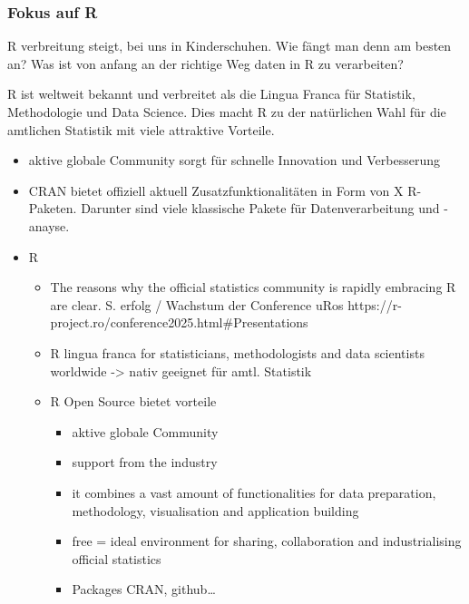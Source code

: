 \documentclass[
  german,
  10pt,
  twoside]{article}
\providecommand{\tightlist}{%
  \setlength{\itemsep}{0pt}\setlength{\parskip}{0pt}}
\begin{document}
\subsubsection{Fokus auf R}\label{fokus-auf-r}

R verbreitung steigt, bei uns in Kinderschuhen. Wie fängt man denn am
besten an? Was ist von anfang an der richtige Weg daten in R zu
verarbeiten?

R ist weltweit bekannt und verbreitet als die Lingua Franca für
Statistik, Methodologie und Data Science. Dies macht R zu der
natürlichen Wahl für die amtlichen Statistik mit viele attraktive
Vorteile.

\begin{itemize}
\item
  aktive globale Community sorgt für schnelle Innovation und
  Verbesserung
\item
  CRAN bietet offiziell aktuell Zusatzfunktionalitäten in Form von X
  R-Paketen. Darunter sind viele klassische Pakete für Datenverarbeitung
  und -anayse.
\item
  R

  \begin{itemize}
  \tightlist
  \item
    The reasons why the official statistics community is rapidly
    embracing R are clear. S. erfolg / Wachstum der Conference uRos
    https://r-project.ro/conference2025.html\#Presentations
  \item
    R lingua franca for statisticians, methodologists and data
    scientists worldwide -\textgreater{} nativ geeignet für amtl.
    Statistik
  \item
    R Open Source bietet vorteile

    \begin{itemize}
    \tightlist
    \item
      aktive globale Community
    \item
      support from the industry
    \item
      it combines a vast amount of functionalities for data preparation,
      methodology, visualisation and application building
    \item
      free = ideal environment for sharing, collaboration and
      industrialising official statistics
    \item
      Packages CRAN, github\ldots{}
    \end{itemize}
  \end{itemize}
\end{itemize}
\end{document}
